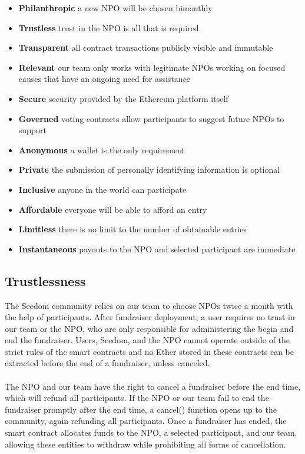 \documentclass[11pt]{article}
\begin{document}
\begin{itemize}
\item{\textbf{Philanthropic} a new NPO will be chosen bimonthly}
\item{\textbf{Trustless} trust in the NPO is all that is required}
\item{\textbf{Transparent} all contract transactions publicly visible and immutable}
\item{\textbf{Relevant} our team only works with legitimate NPOs working on focused causes that have an ongoing need for assistance}
\item{\textbf{Secure} security provided by the Ethereum platform itself}
\item{\textbf{Governed} voting contracts allow participants to suggest future NPOs to support}
\item{\textbf{Anonymous} a wallet is the only requirement}
\item{\textbf{Private} the submission of personally identifying information is optional}
\item{\textbf{Inclusive} anyone in the world can participate}
\item{\textbf{Affordable} everyone will be able to afford an entry}
\item{\textbf{Limitless} there is no limit to the number of obtainable entries}
\item{\textbf{Instantaneous} payouts to the NPO and selected participant are immediate}
\end{itemize}

\subsection{Trustlessness}

The Seedom community relies on our team to choose NPOs twice a month with the help of participants. After fundraiser deployment, a user requires no trust in our team or the NPO, who are only responsible for administering the begin and end the fundraiser. Users, Seedom, and the NPO cannot operate outside of the strict rules of the smart contracts and no Ether stored in these contracts can be extracted before the end of a fundraiser, unless canceled.\\\\
The NPO and our team have the right to cancel a fundraiser before the end time, which will refund all participants. If the NPO or our team fail to end the fundraiser promptly after the end time, a cancel() function opens up to the community, again refunding all participants. Once a fundraiser has ended, the smart contract allocates funds to the NPO, a selected participant, and our team, allowing these entities to withdraw while prohibiting all forms of cancellation.
\end{document}
